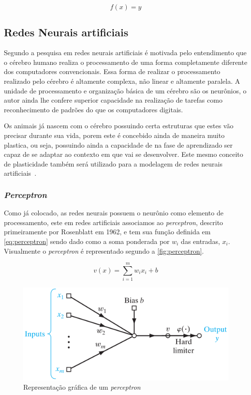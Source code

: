 \documentclass[
    12pt,
    oneside,
    a4paper,
    english,
    brazil
]{abntex2}
\begin{document}
\begin{equation}
    \label{eq:sisCla}
    f(x) = \hat{y}
\end{equation}

\subsection{Redes Neurais artificiais}

Segundo    a pesquisa  em  redes  neurais artificiais  é
motivada pelo entendimento que o cérebro  humano realiza o processamento de uma
forma  completamente diferente  dos computadores  convencionais. Essa  forma de
realizar  o processamento  realizado  pelo cérebro  é  altamente complexa,  não
linear e altamente paralela. A unidade de processamento e organização básica de
um cérebro são  os neurônios, o autor ainda lhe  confere superior capacidade na
realização de  tarefas como  reconhecimento de padrões  do que  os computadores
digitais.

Os animais  já nascem com  o cérebro possuindo  certa estruturas que  estes vão
precisar  durante sua  vida,  porem este  é concebido  ainda  de maneira  muito
plastica, ou seja,  possuindo ainda a capacidade de na  fase de aprendizado ser
capaz de se adaptar ao contexto em  que vai se desenvolver. Este mesmo conceito
de  plasticidade  também será  utilizado  para  a  modelagem de  redes  neurais
artificiais~\cite{haykin2009}.

\subsubsection{\textit{Perceptron}}

Como  já  colocado, as  redes  neurais  possuem  o  neurônio como  elemento  de
processamento,  este em  redes artificiais  associamos ao  \textit{perceptron},
descrito primeiramente  por Rosenblatt em  1962, e  tem sua função  definida em
\autoref{eq:perceptron}  sendo  dado  como  a  soma  ponderada  por  $w_i$  das
entradas,  $x_i$. Visualmente  o \textit{perceptron}  é representado  segundo a
\autoref{fig:perceptron}.

\begin{equation}\label{eq:perceptron}
    v(x) = \sum_{i=1}^{m}{w_i  x_i + b}
\end{equation}

\begin{figure}[ht]
    \centering
    \caption{Representação gráfica de um \textit{perceptron}}\label{fig:perceptron}
    \includegraphics[width=.5\linewidth]{images/perceptron.png}
\end{figure}
\end{document}
